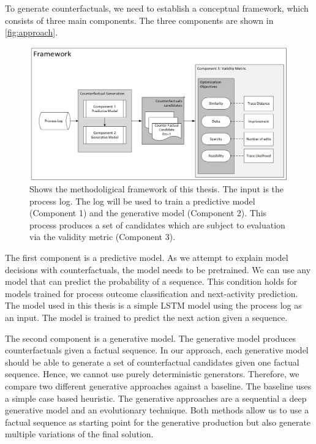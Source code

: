\documentclass[./../../paper.tex]{subfiles}
\begin{document}
To generate counterfactuals, we need to establish a conceptual framework, which consists of three main components. The three components are shown in \autoref{fig:approach}. 

\begin{figure}[htb]
    \centering
    \includegraphics[width=0.99\textwidth]{figures/framework.png}
    \caption{Shows the methodoligical framework of this thesis. The input is the process log. The log will be used to train a predictive model (Component 1) and the generative model (Component 2). This process produces a set of candidates which are subject to evaluation via the validity metric (Component 3).}
    \label{fig:approach}
\end{figure}

The first component is a predictive model. As we attempt to explain model decisions with counterfactuals, the model needs to be pretrained. We can use any model that can predict the probability of a sequence. This condition holds for models trained for process outcome classification and next-activity prediction. The model used in this thesis is a simple LSTM model using the process log as an input. The model is trained to predict the next action given a sequence. 

The second component is a generative model. The generative model produces counterfactuals given a factual sequence. In our approach, each generative model should be able to generate a set of counterfactual candidates given one factual sequence. Hence, we cannot use purely deterministic generators. Therefore, we compare two different generative approaches against a baseline. The baseline uses a simple case based heuristic. The  generative approaches are a sequential a deep generative model and an evolutionary technique. Both methods allow us to use a factual sequence as starting point for the generative production but also generate multiple variations of the final solution. 
\end{document}
